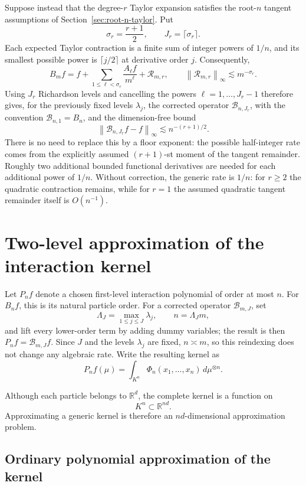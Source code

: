 \documentclass[11pt]{article}
\newcommand{\R}{\mathbb R}
\newcommand{\norm}[1]{\left\lVert #1\right\rVert}
\begin{document}
Suppose instead that the degree-\(r\) Taylor expansion satisfies the
root-\(n\) tangent assumptions of Section~\ref{sec:root-n-taylor}. Put
\[
\sigma_r=\frac{r+1}{2},
\qquad
J_r=\lceil \sigma_r\rceil.
\]
Each expected Taylor contraction is a finite sum of integer powers of
\(1/n\), and its smallest possible power is
\(\lceil j/2\rceil\) at derivative order \(j\). Consequently,
\[
B_mf
=
f
+
\sum_{1\leq\ell<\sigma_r}\frac{A_\ell f}{m^\ell}
+
\mathcal R_{m,r},
\qquad
\norm{\mathcal R_{m,r}}_\infty
\lesssim
m^{-\sigma_r}.
\]
Using \(J_r\) Richardson levels and cancelling the powers
\(\ell=1,\ldots,J_r-1\) therefore gives, for the previously fixed
levels \(\lambda_j\), the corrected operator
\(\mathcal B_{n,J_r}\), with the convention
\(\mathcal B_{n,1}=B_n\), and the dimension-free bound
\[
\boxed{
\norm{\mathcal B_{n,J_r}f-f}_\infty
\lesssim
n^{-(r+1)/2}.
}
\]
There is no need to replace this by a floor exponent: the possible
half-integer rate comes from the explicitly assumed
\((r+1)\)-st moment of the tangent remainder. Roughly two additional
bounded functional derivatives are needed for each additional power of
\(1/n\). Without correction, the generic rate is \(1/n\): for
\(r\geq2\) the quadratic contraction remains, while for \(r=1\) the
assumed quadratic tangent remainder itself is \(O(n^{-1})\).

\section{Two-level approximation of the interaction kernel}
\label{sec:two-level}

Let \(P_nf\) denote a chosen first-level interaction polynomial of
order at most \(n\). For \(B_nf\), this is its natural particle order.
For a corrected operator \(\mathcal B_{m,J}\), set
\[
\Lambda_J=\max_{1\leq j\leq J}\lambda_j,
\qquad
n=\Lambda_Jm,
\]
and lift every lower-order term by adding dummy variables; the result
is then \(P_nf=\mathcal B_{m,J}f\). Since \(J\) and the levels
\(\lambda_j\) are fixed, \(n\asymp m\), so this reindexing does not
change any algebraic rate. Write the resulting kernel as
\[
P_n f(\mu)
=
\int_{K^n}
\Phi_n(x_1,\ldots,x_n)\,d\mu^{\otimes n}.
\]

Although each particle belongs to \(\R^d\), the complete kernel is a
function on
\[
K^n\subset\R^{nd}.
\]
Approximating a generic kernel is therefore an \(nd\)-dimensional
approximation problem.

\subsection{Ordinary polynomial approximation of the kernel}
\end{document}
